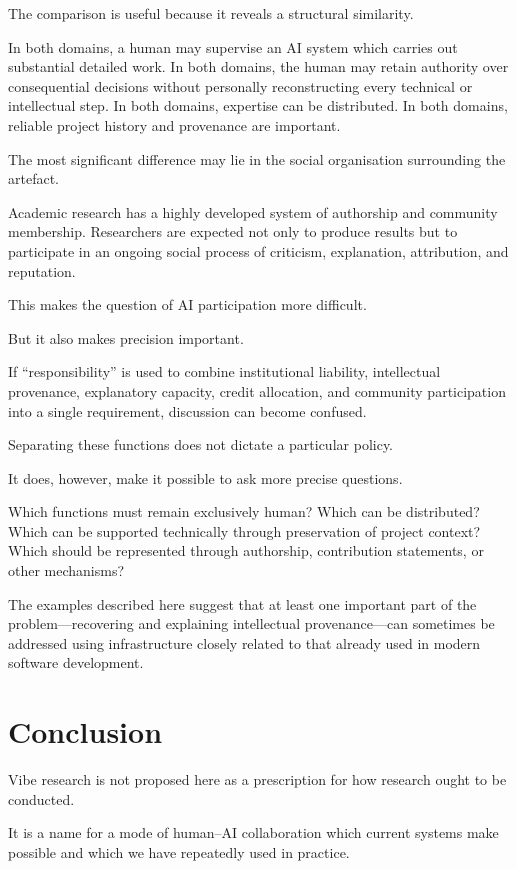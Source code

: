The comparison is useful because it reveals a structural similarity.

In both domains, a human may supervise an AI system which carries out substantial detailed work. In both domains, the human may retain authority over consequential decisions without personally reconstructing every technical or intellectual step. In both domains, expertise can be distributed. In both domains, reliable project history and provenance are important.

The most significant difference may lie in the social organisation surrounding the artefact.

Academic research has a highly developed system of authorship and community membership. Researchers are expected not only to produce results but to participate in an ongoing social process of criticism, explanation, attribution, and reputation.

This makes the question of AI participation more difficult.

But it also makes precision important.

If ``responsibility'' is used to combine institutional liability, intellectual provenance, explanatory capacity, credit allocation, and community participation into a single requirement, discussion can become confused.

Separating these functions does not dictate a particular policy.

It does, however, make it possible to ask more precise questions.

Which functions must remain exclusively human? Which can be distributed? Which can be supported technically through preservation of project context? Which should be represented through authorship, contribution statements, or other mechanisms?

The examples described here suggest that at least one important part of the problem---recovering and explaining intellectual provenance---can sometimes be addressed using infrastructure closely related to that already used in modern software development.


\section{Conclusion}

Vibe research is not proposed here as a prescription for how research ought to be conducted.

It is a name for a mode of human--AI collaboration which current systems make possible and which we have repeatedly used in practice.

